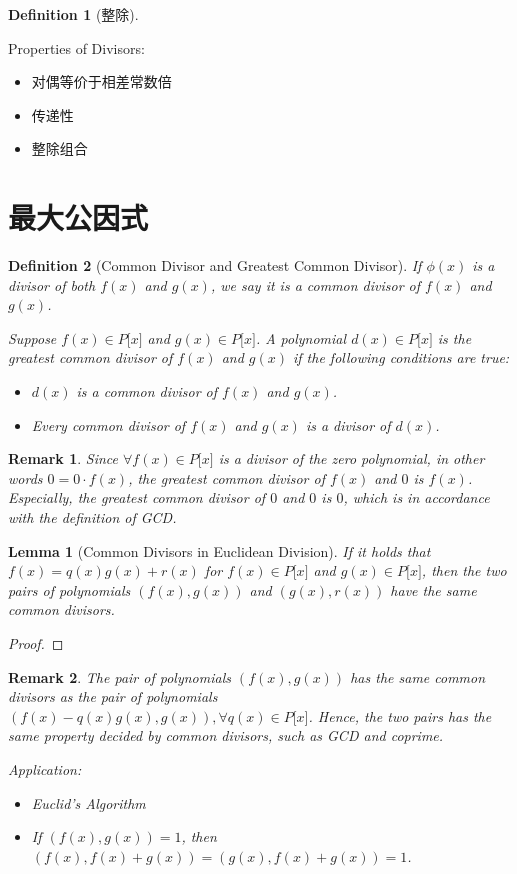 \documentclass[onecolumn]{ctexart}
\newtheorem{definition}{Definition}
\newtheorem{lemma}{Lemma}
\newtheorem{remark}{Remark}
\begin{document}
\begin{definition}[整除]
  
\end{definition}

Properties of Divisors:
\begin{itemize}
  \item 对偶等价于相差常数倍
  \item 传递性
  \item 整除组合
\end{itemize}

\section{最大公因式}

\begin{definition}[Common Divisor and Greatest Common Divisor]
  If $\phi(x)$ is a divisor of both $f(x)$ and $g(x)$, we say it is a common 
  divisor of $f(x)$ and $g(x)$.

  Suppose $f(x) \in P\lbrack x \rbrack$ and $g(x) \in P\lbrack x \rbrack$. A 
  polynomial $d(x) \in P\lbrack x \rbrack$ is the greatest common divisor of 
  $f(x)$ and $g(x)$ if the following conditions are true:
  \begin{itemize}
    \item $d(x)$ is a common divisor of $f(x)$ and $g(x)$.
    \item Every common divisor of $f(x)$ and $g(x)$ is a divisor of $d(x)$.
  \end{itemize}
\end{definition}
\begin{remark}
  Since $\forall f(x) \in P\lbrack x \rbrack$ is a divisor of the zero 
  polynomial, in other words $0 = 0 \cdot f(x)$, the greatest common divisor of 
  $f(x)$ and $0$ is $f(x)$. Especially, the greatest common divisor of $0$ and $0$ 
  is $0$, which is in accordance with the definition of GCD.
\end{remark}

\begin{lemma}[Common Divisors in Euclidean Division]
  If it holds that $f(x) = q(x)g(x) + r(x)$ for $f(x) \in P\lbrack x \rbrack$ 
  and $g(x) \in P\lbrack x \rbrack$, then the two pairs of polynomials $(f(x), 
  g(x))$ and $(g(x), r(x))$ have the same common divisors.
\end{lemma}
\begin{proof}
  
\end{proof}
\begin{remark}
  The pair of polynomials $(f(x), g(x))$ has the same common divisors as the 
  pair of polynomials $(f(x) - q(x)g(x), g(x)), \forall q(x) \in P\lbrack x 
  \rbrack$. Hence, the two pairs has the same property decided by common 
  divisors, such as GCD and coprime.

  Application:
  \begin{itemize}
    \item Euclid's Algorithm
    \item If $(f(x), g(x)) = 1$, then $(f(x), f(x) + g(x)) = (g(x), f(x) + g(x)) 
    = 1$.
  \end{itemize}
\end{remark}
\end{document}
